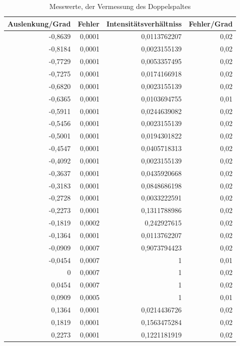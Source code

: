 \documentclass[12pt]{scrartcl}
\begin{document}
\begin{table}[htbp]
\caption{Messwerte, der Vermessung des Doppelspaltes}
\begin{center}
\begin{tabular}{|r|r|r|r|}
\hline
\multicolumn{1}{|l|}{Auslenkung/Grad} & \multicolumn{1}{l|}{Fehler} & \multicolumn{1}{l|}{Intensitätsverhältniss} & \multicolumn{1}{l|}{Fehler/Grad} \\ \hline
-0,8639 & 0,0001 & 0,0113762207 & 0,02 \\ \hline
-0,8184 & 0,0001 & 0,0023155139 & 0,02 \\ \hline
-0,7729 & 0,0001 & 0,0053357495 & 0,02 \\ \hline
-0,7275 & 0,0001 & 0,0174166918 & 0,02 \\ \hline
-0,6820 & 0,0001 & 0,0023155139 & 0,02 \\ \hline
-0,6365 & 0,0001 & 0,0103694755 & 0,01 \\ \hline
-0,5911 & 0,0001 & 0,0244639082 & 0,02 \\ \hline
-0,5456 & 0,0001 & 0,0023155139 & 0,02 \\ \hline
-0,5001 & 0,0001 & 0,0194301822 & 0,02 \\ \hline
-0,4547 & 0,0001 & 0,0405718313 & 0,02 \\ \hline
-0,4092 & 0,0001 & 0,0023155139 & 0,02 \\ \hline
-0,3637 & 0,0001 & 0,0435920668 & 0,02 \\ \hline
-0,3183 & 0,0001 & 0,0848686198 & 0,02 \\ \hline
-0,2728 & 0,0001 & 0,0033222591 & 0,02 \\ \hline
-0,2273 & 0,0001 & 0,1311788986 & 0,02 \\ \hline
-0,1819 & 0,0002 & 0,242927615 & 0,02 \\ \hline
-0,1364 & 0,0001 & 0,0113762207 & 0,02 \\ \hline
-0,0909 & 0,0007 & 0,9073794423 & 0,02 \\ \hline
-0,0454 & 0,0007 & 1 & 0,01 \\ \hline
0 & 0,0007 & 1 & 0,02 \\ \hline
0,0454 & 0,0007 & 1 & 0,02 \\ \hline
0,0909 & 0,0005 & 1 & 0,01 \\ \hline
0,1364 & 0,0001 & 0,0214436726 & 0,02 \\ \hline
0,1819 & 0,0001 & 0,1563475284 & 0,02 \\ \hline
0,2273 & 0,0001 & 0,1221181919 & 0,02 \\ \hline

\end{tabular}
\end{center}
\end{table}
\end{document}
